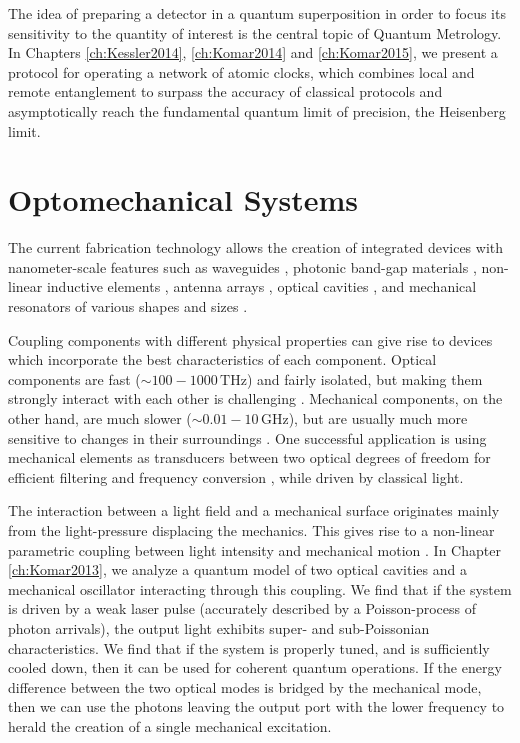 The idea of preparing a detector in a quantum
superposition in order to focus its sensitivity to the quantity of interest is
the central topic of Quantum Metrology. In Chapters \ref{ch:Kessler2014},
\ref{ch:Komar2014} and \ref{ch:Komar2015}, we present a
protocol for operating a network of atomic clocks, which combines local and
remote entanglement to surpass the accuracy of classical protocols and
asymptotically reach the fundamental quantum limit of precision, the Heisenberg limit. 


 
 
 
 
 
 
\section{Optomechanical Systems}
The current fabrication technology allows the creation of integrated devices
with nanometer-scale features such as waveguides \cite{Mekis1996}, photonic
band-gap materials \cite{Foresi1997}, non-linear inductive elements
\cite{Makhlin1999}, antenna arrays \cite{Yu2014}, optical cavities
\cite{Painter2001}, and mechanical resonators of various shapes and sizes
\cite{Aspelmeyer2014}.

Coupling components with different physical properties can give rise to devices
which incorporate the best characteristics of each component.
Optical components are fast ($\sim 100-1000\,\mathrm{THz}$) and fairly isolated,
but making them strongly interact with each other is challenging
\cite{Chang2007}.
Mechanical components, on the other hand, are much slower ($\sim
0.01-10\,\mathrm{GHz}$), but are usually much more sensitive to changes in their
surroundings \cite{Aspelmeyer2014}. One successful application is using
mechanical elements as transducers between two optical degrees of freedom 
for efficient filtering and frequency conversion \cite{Eichenfield2009}, while
driven by classical light.

The interaction between a light field and a mechanical surface originates
mainly from the light-pressure displacing the mechanics. This gives rise to a
non-linear parametric coupling between light intensity and mechanical motion
\cite{Meystre2013}. In Chapter \ref{ch:Komar2013}, we analyze a quantum model of
two optical cavities and a mechanical oscillator interacting through this
coupling. We find that if the system is driven by a weak laser pulse (accurately
described by a Poisson-process of photon arrivals), the output light exhibits
super- and sub-Poissonian characteristics. We find that if the system is
properly tuned, and is sufficiently cooled down, then it can be used for
coherent quantum operations.
If the energy difference between the two optical modes is bridged by the
mechanical mode, then we can use the photons leaving the output
port with the lower frequency to herald the creation of a single mechanical
excitation.

